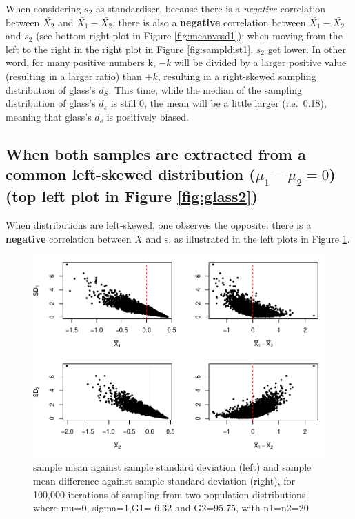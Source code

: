 \documentclass[
  man,floatsintext]{apa6}
\begin{document}
When considering \(s_2\) as standardiser, because there is a \emph{negative} correlation between \(\bar{X_2}\) and \(\bar{X_1}-\bar{X_2}\), there is also a \textbf{negative} correlation between \(\bar{X_1}-\bar{X_2}\) and \(s_2\) (see bottom right plot in Figure \ref{fig:meanvssd1}): when moving from the left to the right in the right plot in Figure \ref{fig:sampldist1}, \(s_2\) get lower. In other word, for many positive numbers k, \(-k\) will be divided by a larger positive value (resulting in a larger ratio) than \(+ k\), resulting in a right-skewed sampling distribution of glass's \(d_S\). This time, while the median of the sampling distribution of glass's \(d_s\) is still 0, the mean will be a little larger (i.e.~0.18), meaning that glass's \(d_s\) is positively biased.

\hypertarget{when-both-samples-are-extracted-from-a-common-left-skewed-distribution-mu_1-mu_20-top-left-plot-in-figure}{%
\subsection{\texorpdfstring{When both samples are extracted from a common left-skewed distribution (\textbf{\(\mu_1-\mu_2=0\)}) (top left plot in Figure \ref{fig:glass2})}{When both samples are extracted from a common left-skewed distribution (\textbackslash mu\_1-\textbackslash mu\_2=0) (top left plot in Figure )}}\label{when-both-samples-are-extracted-from-a-common-left-skewed-distribution-mu_1-mu_20-top-left-plot-in-figure}}

When distributions are left-skewed, one observes the opposite: there is a \textbf{negative} correlation between \(\bar{X}\) and s, as illustrated in the left plots in Figure \ref{fig:meanvssd2}.

\begin{figure}
\centering
\includegraphics{Mathematical-study-of-Glass-s-d_files/figure-latex/meanvssd2-1.pdf}
\caption{\label{fig:meanvssd2}sample mean against sample standard deviation (left) and sample mean difference against sample standard deviation (right), for 100,000 iterations of sampling from two population distributions where mu=0, sigma=1,G1=-6.32 and G2=95.75, with n1=n2=20}
\end{figure}
\end{document}
